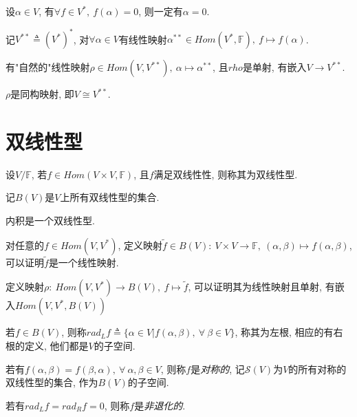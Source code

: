 \begin{statement}
    设$\alpha \in V$, 有$\forall f \in V^*,\ f(\alpha)=0$, 则一定有$\alpha = 0$.
\end{statement}

\begin{example}
    记$V^{**}\triangleq(V^*)^*$, 对$\forall \alpha \in V$有线性映射$\alpha{^{**}}\in Hom(V^*, \mathbb{F}),\ f\mapsto f(\alpha)$.\par
    有"自然的"线性映射$\rho \in Hom(V, V^{**}),\ \alpha \mapsto \alpha{^{**}}$, 且$rho$是单射, 有嵌入$V\to V^{**}$.
\end{example}

\begin{theorem}[对偶定理]
    $\rho$是同构映射, 即$V\cong V^{**}$.
\end{theorem}

\section{ 双线性型 }

\begin{definition}[双线性型]
    设$V/\mathbb{F}$, 若$f\in Hom(V\times V, \mathbb{F})$, 且$f$满足双线性性, 则称其为双线性型.\par
    记$B(V)$是$V$上所有双线性型的集合.
\end{definition}

\begin{example}
    内积是一个双线性型.
\end{example}

\begin{example}
    对任意的$f\in Hom(V, V^*)$, 定义映射$\tilde{f}\in B(V):\ V\times V\to \mathbb{F},\ (\alpha, \beta)\mapsto f(\alpha, \beta)$, 可以证明$\tilde{f}$是一个线性映射.\par
    定义映射$\rho:\ Hom(V, V^*)\to B(V),\ f\mapsto \tilde{f}$, 可以证明其为线性映射且单射, 有嵌入$Hom(V,V^*, B(V))$
\end{example}

\begin{definition}[左右根]
    若$f\in B(V)$, 则称$rad_Lf\triangleq\{\alpha\in V|f(\alpha, \beta),\ \forall\ \beta \in V\}$, 称其为左根, 相应的有右根的定义, 他们都是$V$的子空间.\par
    若有$f(\alpha, \beta)=f(\beta, \alpha),\ \forall\ \alpha, \beta \in V$, 则称$f$是\emph{对称的}, 记$\mathscr{S}(V)$为$V$的所有对称的双线性型的集合, 作为$B(V)$的子空间.\par
    若有$rad_Lf=rad_Rf=0$, 则称$f$是\emph{非退化的}.
\end{definition}

